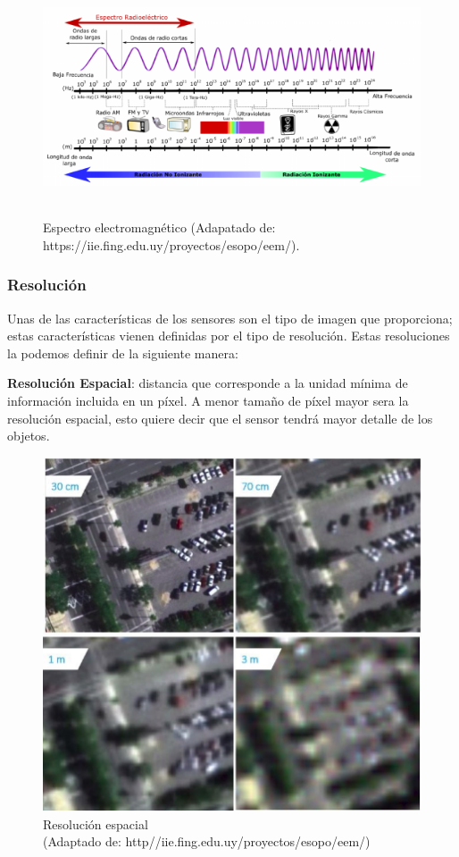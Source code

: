 \begin{figure}[H] \centering
  \includegraphics[height=7cm,keepaspectratio=true,clip=true]{imagenes/MarcoTeorico/espectro-electro.png}
  \caption{Espectro electromagnético (Adapatado de: https://iie.fing.edu.uy/proyectos/esopo/eem/).}\label{Fig:espectro-electromagnetico}
\end{figure}


\subsubsection{Resolución}
Unas de las características de los sensores son el tipo de imagen que proporciona; estas características vienen definidas por el tipo de resolución. Estas resoluciones la podemos definir de la siguiente manera:

\par \textbf{Resolución Espacial}: distancia que corresponde a la unidad mínima de información incluida en un píxel. A menor tamaño de píxel mayor sera la resolución espacial, esto quiere decir que el sensor tendrá mayor detalle de los objetos.

\begin{figure}[H] \centering
  \includegraphics[scale=0.4,keepaspectratio=true,clip=true]{imagenes/MarcoTeorico/resolucion.png}
  \caption{Resolución espacial \\  (Adaptado de: http//iie.fing.edu.uy/proyectos/esopo/eem/)} \label{Fig:resolucion-esp}
\end{figure}

